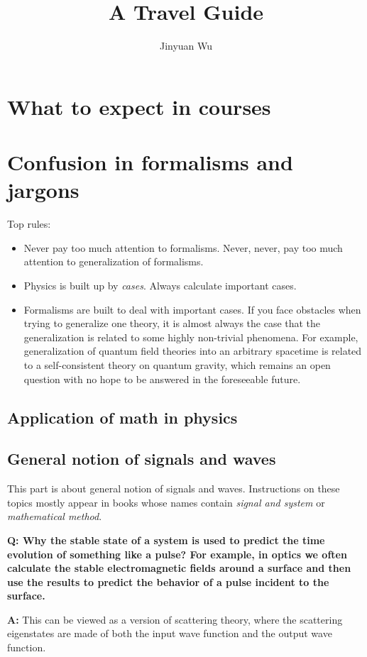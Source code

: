 \documentclass[hyperref, a4paper]{article}
\title{A Travel Guide}
\author{Jinyuan Wu}
\newenvironment{qanda}{\setlength{\parindent}{0pt}}{\bigskip}
\newcommand{\Q}{\bigskip\bfseries Q: }
\newcommand{\A}{\par\textbf{A:} \normalfont}
\begin{document}
\maketitle

\section{What to expect in courses}

\section{Confusion in formalisms and jargons}

Top rules:
\begin{itemize}
    \item Never pay too much attention to formalisms. Never, never, pay too much attention to generalization of formalisms.
    \item Physics is built up by \emph{cases}. Always calculate important cases.
    \item Formalisms are built to deal with important cases. If you face obstacles when trying to generalize one theory, it is almost always the case that the generalization is related to some highly non-trivial phenomena.
    For example, generalization of quantum field theories into an arbitrary spacetime is related to a self-consistent theory on quantum gravity, which remains an open question with no hope to be answered in the foreseeable future.
\end{itemize}

\subsection{Application of math in physics}

\subsection{General notion of signals and waves}

This part is about general notion of signals and waves. Instructions on these topics mostly appear in books whose names contain \emph{signal and system} or \emph{mathematical method}.

\begin{qanda}

\Q Why the stable state of a system is used to predict the time evolution of something like a pulse? 
For example, in optics we often calculate the stable electromagnetic fields around a surface and then use the results to predict
the behavior of a pulse incident to the surface.
\A This can be viewed as a version of scattering theory, where the scattering eigenstates are made of both the
input wave function and the output wave function.

\end{qanda}
\end{document}

